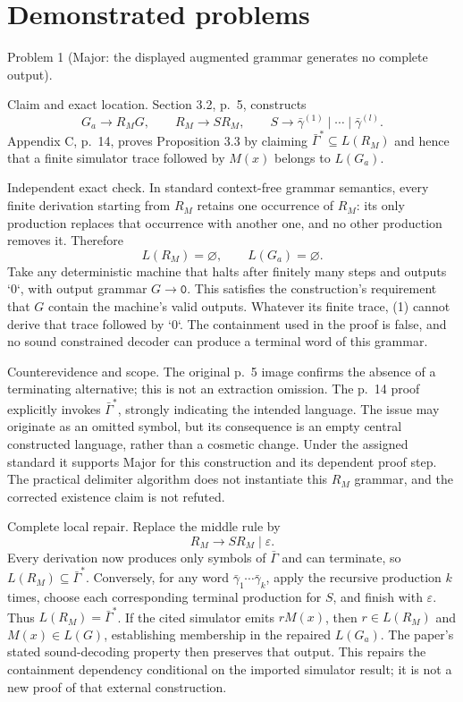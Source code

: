 \documentclass[10pt]{article}
\begin{document}
\section*{Demonstrated problems}
Problem 1 (Major: the displayed augmented grammar generates no complete output).\par
Claim and exact location. Section 3.2, p. 5, constructs \[G_a\to R_M G,\qquad R_M\to S R_M,\qquad
 S\to\bar\gamma^{(1)}\mid\cdots\mid\bar\gamma^{(l)}.
 \tag{1}\] Appendix C, p. 14, proves Proposition 3.3 by claiming \(\bar\Gamma^*\subseteq L(R_M)\) and hence that a finite simulator trace followed by \(M(x)\) belongs to \(L(G_a)\).\par
Independent exact check. In standard context-free grammar semantics, every finite derivation starting from \(R_M\) retains one occurrence of \(R_M\): its only production replaces that occurrence with another one, and no other production removes it. Therefore \[L(R_M)=\varnothing,\qquad L(G_a)=\varnothing.
 \tag{2}\] Take any deterministic machine that halts after finitely many steps and outputs `0`, with output grammar \(G\to\texttt{0}\). This satisfies the construction’s requirement that \(G\) contain the machine’s valid outputs. Whatever its finite trace, (1) cannot derive that trace followed by `0`. The containment used in the proof is false, and no sound constrained decoder can produce a terminal word of this grammar.\par
Counterevidence and scope. The original p. 5 image confirms the absence of a terminating alternative; this is not an extraction omission. The p. 14 proof explicitly invokes \(\bar\Gamma^*\), strongly indicating the intended language. The issue may originate as an omitted symbol, but its consequence is an empty central constructed language, rather than a cosmetic change. Under the assigned standard it supports Major for this construction and its dependent proof step. The practical delimiter algorithm does not instantiate this \(R_M\) grammar, and the corrected existence claim is not refuted.\par
Complete local repair. Replace the middle rule by \[R_M\to S R_M\mid\varepsilon.
 \tag{3}\] Every derivation now produces only symbols of \(\bar\Gamma\) and can terminate, so \(L(R_M)\subseteq\bar\Gamma^*\). Conversely, for any word \(\bar\gamma_1\cdots\bar\gamma_k\), apply the recursive production \(k\) times, choose each corresponding terminal production for \(S\), and finish with \(\varepsilon\). Thus \(L(R_M)=\bar\Gamma^*\). If the cited simulator emits \(rM(x)\), then \(r\in L(R_M)\) and \(M(x)\in L(G)\), establishing membership in the repaired \(L(G_a)\). The paper’s stated sound-decoding property then preserves that output. This repairs the containment dependency conditional on the imported simulator result; it is not a new proof of that external construction.\par
\end{document}
